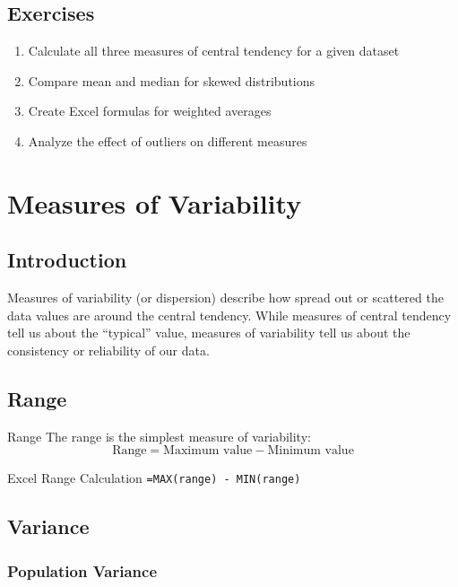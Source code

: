 \documentclass[12pt,a4paper]{book}
\begin{document}
\section{Exercises}

\begin{enumerate}
    \item Calculate all three measures of central tendency for a given dataset
    \item Compare mean and median for skewed distributions
    \item Create Excel formulas for weighted averages
    \item Analyze the effect of outliers on different measures
\end{enumerate}

\chapter{Measures of Variability}

\section{Introduction}

Measures of variability (or dispersion) describe how spread out or scattered the data values are around the central tendency. While measures of central tendency tell us about the ``typical'' value, measures of variability tell us about the consistency or reliability of our data.

\section{Range}

\begin{definition}{Range}
The range is the simplest measure of variability:
\[
\text{Range} = \text{Maximum value} - \text{Minimum value}
\]
\end{definition}

\begin{example}{Excel Range Calculation}
\texttt{=MAX(range) - MIN(range)}
\end{example}

\section{Variance}

\subsection{Population Variance}
\end{document}
